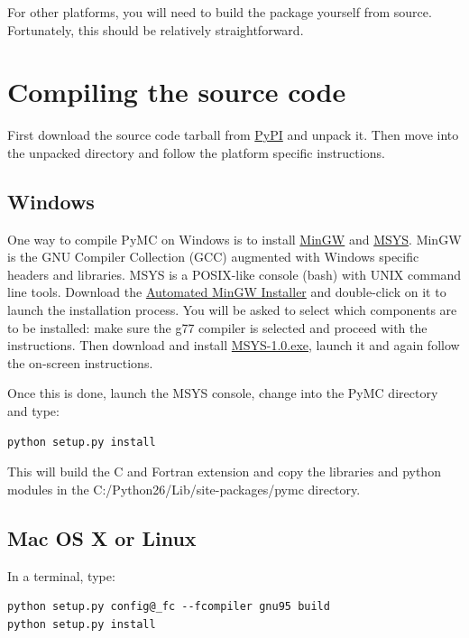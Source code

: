 \documentclass[letterpaper,10pt,english]{sphinxmanual}
\begin{document}
For other platforms, you will need to build the package yourself from source.
Fortunately, this should be relatively straightforward.


\section{Compiling the source code}
\label{INSTALL:pymc-site}\label{INSTALL:compiling-the-source-code}
First download the source code tarball from \href{http://pypi.python.org/pypi/pymc/}{PyPI} and unpack it. Then move
into the unpacked directory and follow the platform specific instructions.


\subsection{Windows}
\label{INSTALL:windows}
One way to compile PyMC on Windows is to install \href{http://www.mingw.org/}{MinGW} and \href{http://www.mingw.org/wiki/MSYS}{MSYS}. MinGW is
the GNU Compiler Collection (GCC) augmented with Windows specific headers and
libraries. MSYS is a POSIX-like console (bash) with UNIX command line tools.
Download the \href{http://sourceforge.net/projects/mingw/files/}{Automated MinGW Installer} and double-click on it to launch
the installation process. You will be asked to select which
components are to be installed: make sure the g77 compiler is selected and
proceed with the instructions. Then download and install \href{http://downloads.sourceforge.net/mingw/MSYS-1.0.11.exe}{MSYS-1.0.exe},
launch it and again follow the on-screen instructions.

Once this is done, launch the MSYS console, change into the PyMC directory and
type:

\begin{Verbatim}[commandchars=@\[\]]
python setup.py install
\end{Verbatim}

This will build the C and Fortran extension and copy the libraries and python
modules in the C:/Python26/Lib/site-packages/pymc directory.


\subsection{Mac OS X or Linux}
\label{INSTALL:msys-1-0-exe}\label{INSTALL:mac-os-x-or-linux}
In a terminal, type:

\begin{Verbatim}[commandchars=@\[\]]
python setup.py config@_fc --fcompiler gnu95 build
python setup.py install
\end{Verbatim}
\end{document}
